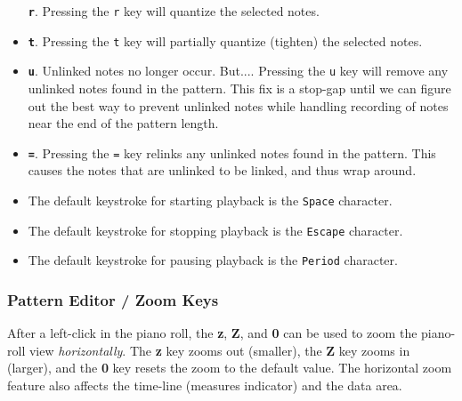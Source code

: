 \begin{itemize}
         \textbf{\texttt{r}}.
         Pressing the \texttt{r} key will quantize the selected notes.
      \item
         \textbf{\texttt{t}}.
         Pressing the \texttt{t} key will partially quantize (tighten)
         the selected notes.
      \item
         \textbf{\texttt{u}}.
         Unlinked notes no longer occur.  But....
         Pressing the \texttt{u} key will remove any unlinked notes found in
         the pattern.
         This fix is a stop-gap until we can figure out
         the best way to prevent unlinked notes while handling recording of
         notes near the end of the pattern length.
      \item
         \textbf{\texttt{=}}.
         Pressing the \texttt{=} key relinks any unlinked notes found in
         the pattern. This causes the notes that are unlinked to be linked, and
         thus wrap around.
      \item
         The default keystroke for starting playback is the \texttt{Space}
         character.
      \item
         The default keystroke for stopping playback is the \texttt{Escape}
         character.
      \item
         The default keystroke for pausing playback is the \texttt{Period}
         character.
   \end{itemize}

\subsubsection{Pattern Editor / Zoom Keys}
\label{subsubsec:pattern_editor_zoom_keys}

   After a left-click in the piano roll, the
   \textbf{z}, \textbf{Z}, and \textbf{0}
   can be used to zoom the piano-roll view \textsl{horizontally}.
   The \textbf{z} key zooms out (smaller),
   the \textbf{Z} key zooms in (larger),
   and the \textbf{0} key resets the zoom to the default value.
   The horizontal zoom feature also affects the time-line
   (measures indicator) and the data area.

